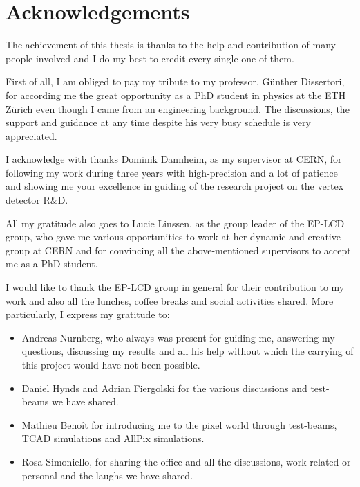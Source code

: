 \chapter{Acknowledgements}
\label{sec:ack}

The achievement of this thesis is thanks to the help and contribution
of many people involved and I do my best to credit every single one of
them.

First of all, I am obliged to pay my tribute to my professor, Günther
Dissertori, for according me the great opportunity as a PhD student in
physics at the ETH Zürich even though I came from an engineering
background. The discussions, the support and guidance at any time
despite his very busy schedule is very appreciated.

I acknowledge with thanks Dominik Dannheim, as my supervisor at CERN,
for following my work during three years with high-precision and a lot
of patience and showing me your excellence in guiding of the research
project on the vertex detector R\&D.

All my gratitude also goes to Lucie Linssen, as the group leader of
the EP-LCD group, who gave me various opportunities to work at her
dynamic and creative group at CERN and for convincing all the
above-mentioned supervisors to accept me as a PhD student.

I would like to thank the EP-LCD group in general for their
contribution to my work and also all the lunches, coffee breaks and
social activities shared. More particularly, I express my gratitude
to:

\begin{itemize}
\item Andreas Nurnberg, who always was present for guiding me,
  answering my questions, discussing my results and all his help
  without which the carrying of this project would have not been
  possible.
\item Daniel Hynds and Adrian Fiergolski for the various discussions
  and test-beams we have shared.
\item Mathieu Benoît for introducing me to the pixel world through
  test-beams, TCAD simulations and AllPix simulations.
\item Rosa Simoniello, for sharing the office and all the discussions,
  work-related or personal and the laughs we have shared.
\end{itemize}

